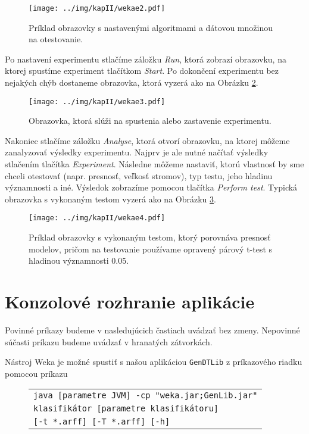 \begin{figure}[h!]
\centering
\centerline{\mbox{\texttt{[image: ../img/kapII/wekae2.pdf]}}}
\caption{Príklad obrazovky s nastavenými algoritmami a dátovou množinou na otestovanie.}\label{fig:guie2}
\end{figure}

Po nastavení experimentu stlačíme záložku \emph{Run}, ktorá zobrazí obrazovku, na ktorej spustíme experiment tlačítkom \emph{Start}. Po dokončení experimentu bez nejakých chýb dostaneme obrazovka, ktorá vyzerá ako na Obrázku \ref{fig:guie3}.

\begin{figure}[h!]
\centering
\centerline{\mbox{\texttt{[image: ../img/kapII/wekae3.pdf]}}}
\caption{Obrazovka, ktorá slúži na spustenia alebo zastavenie experimentu.}\label{fig:guie3}
\end{figure}

Nakoniec stlačíme záložku \emph{Analyse}, ktorá otvorí obrazovku, na ktorej môžeme zanalyzovať výsledky experimentu. Najprv je ale nutné načítať výsledky stlačením tlačítka \emph{Experiment}. Následne môžeme nastaviť, ktorú vlastnosť by sme chceli otestovať (napr. presnosť, veľkosť stromov), typ testu, jeho hladinu významnosti a iné. Výsledok zobrazíme pomocou tlačítka \emph{Perform test}. Typická obrazovka s vykonaným testom vyzerá ako na Obrázku \ref{fig:guie4}.

\begin{figure}[h!]
\centering
\centerline{\mbox{\texttt{[image: ../img/kapII/wekae4.pdf]}}}
\caption{Príklad obrazovky s vykonaným testom, ktorý porovnáva presnosť modelov, pričom na testovanie používame opravený párový t-test s hladinou významnosti 0.05.}\label{fig:guie4}
\end{figure}

\pagebreak

\section{Konzolové rozhranie aplikácie}
\begin{observation}
Povinné príkazy budeme v nasledujúcich častiach uvádzať bez zmeny. Nepovinné súčasti príkazu budeme uvádzať v hranatých zátvorkách.
\end{observation}

Nástroj Weka je možné spustiť s našou aplikáciou \verb|GenDTLib| z príkazového riadku pomocou príkazu

\begin{figure}[h!]
\centering
\begin{tabular}{|l|}
\hline
\texttt{java [parametre JVM] -cp "weka.jar;GenLib.jar"}  \\
\texttt{klasifikátor [parametre klasifikátoru]} \\
\texttt{[-t *.arff] [-T *.arff] [-h]} \\
\hline
\end{tabular}
\caption{}
\end{figure}

